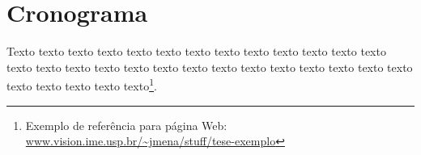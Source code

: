 \chapter{Cronograma}
\label{cap:conclusoes}

Texto texto texto texto texto texto texto texto texto texto texto texto texto
texto texto texto texto texto texto texto texto texto texto texto texto texto
texto texto texto texto texto texto\footnote{Exemplo de referência para página
Web: \url{www.vision.ime.usp.br/~jmena/stuff/tese-exemplo}}.


